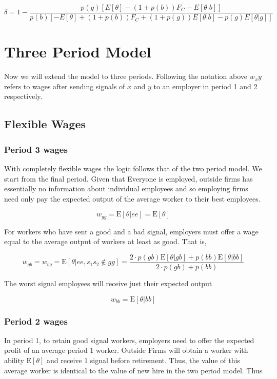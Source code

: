 \documentclass[11pt]{article}
\newcommand{\E}{\mathrm{E}}
\begin{document}
$$ \delta = 1- \frac{p(g) \left[ E[\theta] - (1 + p(b))F_C - E[\theta|b] \right]}{p(b) \left[ -E[\theta] + (1+p(b))F_C + (1+p(g))E[\theta|b] - p(g)E[\theta|g] \right]}$$


\section{Three Period Model}

Now we will extend the model to three periods. Following the notation above $w_xy$ refers to wages after sending signals of $x$ and $y$ to an employer in period 1 and 2 respectively. 

\subsection{Flexible Wages}

\subsubsection{Period 3 wages }

With completely flexible wages the logic follows that of the two period model. We start from the final period. Given that Everyone is employed, outside firms has essentially no information about individual employees and so employing firms need only pay the expected output of the average worker to their best employees. 

$$ w_{gg} = \E[\theta|ee] = \E[\theta]$$

For workers who have sent a good and a bad signal, employers must offer a wage equal to the average output of workers at least as good. That is, 

$$w_{gb} = w_{bg} = \E[\theta| ee, s_1 s_2 \notin gg] = \frac{2 \cdot p(gb)\E[\theta|gb] + p(bb) \E[\theta|bb]}{2 \cdot p(gb) + p(bb)} $$

The worst signal employees will receive just their expected output 

$$ w_{bb} = \E[\theta|bb]$$

\subsubsection{Period 2 wages }

In period 1, to retain good signal workers, employers need to offer the expected profit of an average period 1 worker. Outside Firms will obtain a worker with ability $\E[\theta]$ and receive 1 signal before retirement. Thus, the value of this average worker is identical to the value of new hire in the two period model. Thus 
\end{document}
